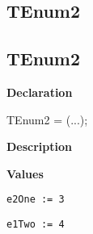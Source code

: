 \documentclass{report}
\newif\ifpdf
\begin{document}
\subsection*{\large{\textbf{TEnum2}}\normalsize\hspace{1ex}\hrulefill}
\else
\subsection*{TEnum2}
\fi
\label{ok_enum_explicit_assign-TEnum2}
\begin{list}{}{
\setlength{\itemindent}{0cm}
\setlength{\listparindent}{0cm}
\setlength{\leftmargin}{\evensidemargin}
\addtolength{\leftmargin}{\tmplength}
\settowidth{\labelsep}{X}
\addtolength{\leftmargin}{\labelsep}
\setlength{\labelwidth}{\tmplength}
}
\item[\textbf{Declaration}\hfill]
\ifpdf
\begin{flushleft}
\fi
\begin{ttfamily}
TEnum2 = (...);\end{ttfamily}

\ifpdf
\end{flushleft}
\fi

\par
\item[\textbf{Description}]
 \item[\textbf{Values}]
\begin{description}
\item[\texttt{e2One := 3}] \label{ok_enum_explicit_assign-e2One}
\index{}
 
\item[\texttt{e1Two := 4}] \label{ok_enum_explicit_assign-e1Two}
\index{}
 
\end{description}


\end{list}
\end{document}
